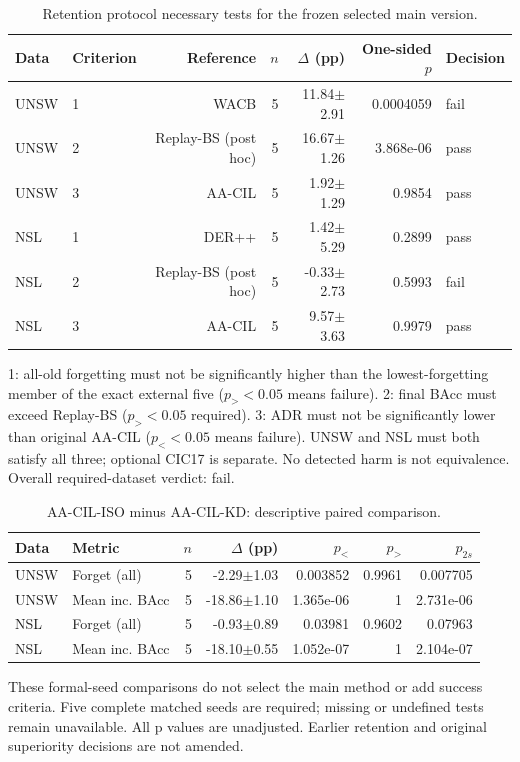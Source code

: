 \begin{table}[t]
\centering\scriptsize
\setlength{\tabcolsep}{3.3pt}
\caption{Retention protocol necessary tests for the frozen selected main version.}\label{tab:section298-required}
\begin{tabular}{llrrrrl}
\toprule
Data & Criterion & Reference & $n$ & $\Delta$ (pp) & One-sided $p$ & Decision \\
\midrule
UNSW & 1 & WACB & 5 & 11.84$\pm$2.91 & 0.0004059 & fail \\
UNSW & 2 & Replay-BS (post hoc) & 5 & 16.67$\pm$1.26 & 3.868e-06 & pass \\
UNSW & 3 & AA-CIL & 5 & 1.92$\pm$1.29 & 0.9854 & pass \\
NSL & 1 & DER++ & 5 & 1.42$\pm$5.29 & 0.2899 & pass \\
NSL & 2 & Replay-BS (post hoc) & 5 & -0.33$\pm$2.73 & 0.5993 & fail \\
NSL & 3 & AA-CIL & 5 & 9.57$\pm$3.63 & 0.9979 & pass \\
\bottomrule
\end{tabular}
\par\smallskip\begin{minipage}{0.98\textwidth}\scriptsize 1: all-old forgetting must not be significantly higher than the lowest-forgetting member of the exact external five ($p_{>}<0.05$ means failure). 2: final BAcc must exceed Replay-BS ($p_{>}<0.05$ required). 3: ADR must not be significantly lower than original AA-CIL ($p_{<}<0.05$ means failure). UNSW and NSL must both satisfy all three; optional CIC17 is separate. No detected harm is not equivalence. Overall required-dataset verdict: fail. \end{minipage}
\end{table}

\begin{table}[t]
\centering\scriptsize
\setlength{\tabcolsep}{3.3pt}
\caption{AA-CIL-ISO minus AA-CIL-KD: descriptive paired comparison.}\label{tab:section298-iso-kd}
\begin{tabular}{llrrrrr}
\toprule
Data & Metric & $n$ & $\Delta$ (pp) & $p_{<}$ & $p_{>}$ & $p_{2s}$ \\
\midrule
UNSW & Forget (all) & 5 & -2.29$\pm$1.03 & 0.003852 & 0.9961 & 0.007705 \\
UNSW & Mean inc. BAcc & 5 & -18.86$\pm$1.10 & 1.365e-06 & 1 & 2.731e-06 \\
NSL & Forget (all) & 5 & -0.93$\pm$0.89 & 0.03981 & 0.9602 & 0.07963 \\
NSL & Mean inc. BAcc & 5 & -18.10$\pm$0.55 & 1.052e-07 & 1 & 2.104e-07 \\
\bottomrule
\end{tabular}
\par\smallskip\begin{minipage}{0.98\textwidth}\scriptsize These formal-seed comparisons do not select the main method or add success criteria. Five complete matched seeds are required; missing or undefined tests remain unavailable. All p values are unadjusted. Earlier retention and original superiority decisions are not amended.\end{minipage}
\end{table}
